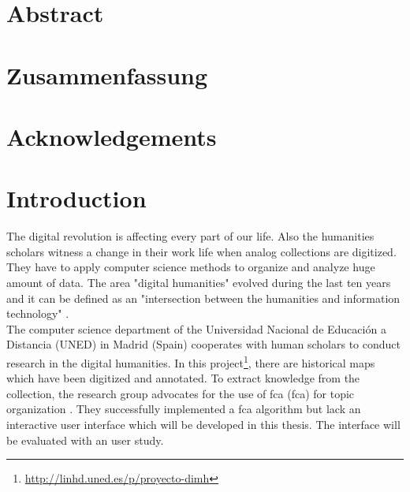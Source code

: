 \documentclass[11pt]{report}
\begin{document}


\renewcommand{\thepage}{\roman{page}}%

\newpage
\thispagestyle{empty}
\mbox{}

\chapter*{Abstract}
\blindtext

\newpage
\thispagestyle{empty}
\mbox{}

\chapter*{Zusammenfassung}
\blindtext

\newpage
\thispagestyle{empty}
\mbox{}

\chapter*{Acknowledgements}
\blindtext

\newpage
\thispagestyle{empty}
\mbox{}

\tableofcontents
\newpage

\printglossary[type=\acronymtype]

\newpage
\thispagestyle{empty}
\mbox{}


\chapter{Introduction}

\renewcommand{\thepage}{\arabic{page}}
\setcounter{page}{1}

The digital revolution is affecting every part of our life. Also the humanities scholars witness a change in their work life when analog collections are digitized. They have to apply computer science methods to organize and analyze huge amount of data. The area "digital humanities" evolved during the last ten years and it can be defined as an "intersection between the humanities and information technology" \cite{Svensson2010}.\\

 The computer science department of the Universidad Nacional de Educación a Distancia (UNED) in Madrid (Spain) cooperates with human scholars to conduct research in the digital humanities. In this project\footnote{\url{http://linhd.uned.es/p/proyecto-dimh}}, there are historical maps which have been digitized and annotated. To extract knowledge from the collection, the research group advocates for the use of \acrlong{fca} (\acrshort{fca}) for topic organization \cite{Castellanos,Cigarran}. They successfully implemented a \acrshort{fca} algorithm but lack an interactive user interface which will be developed in this thesis. The interface will be evaluated with an user study. \\
 
\end{document}
